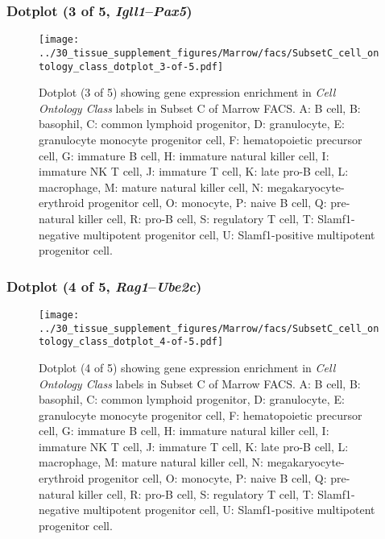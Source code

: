 \subsubsection{Dotplot (3 of 5, \emph{Igll1}--\emph{Pax5})}
\begin{figure}[h]
\centering
\texttt{[image: ../30\_tissue\_supplement\_figures/Marrow/facs/SubsetC\_cell\_ontology\_class\_dotplot\_3-of-5.pdf]}

\caption{ Dotplot (3 of 5)  showing gene expression enrichment in \emph{Cell Ontology Class} labels in Subset C of Marrow FACS. A: B cell, B: basophil, C: common lymphoid progenitor, D: granulocyte, E: granulocyte monocyte progenitor cell, F: hematopoietic precursor cell, G: immature B cell, H: immature natural killer cell, I: immature NK T cell, J: immature T cell, K: late pro-B cell, L: macrophage, M: mature natural killer cell, N: megakaryocyte-erythroid progenitor cell, O: monocyte, P: naive B cell, Q: pre-natural killer cell, R: pro-B cell, S: regulatory T cell, T: Slamf1-negative multipotent progenitor cell, U: Slamf1-positive multipotent progenitor cell.}
\end{figure}


\clearpage

\subsubsection{Dotplot (4 of 5, \emph{Rag1}--\emph{Ube2c})}
\begin{figure}[h]
\centering
\texttt{[image: ../30\_tissue\_supplement\_figures/Marrow/facs/SubsetC\_cell\_ontology\_class\_dotplot\_4-of-5.pdf]}

\caption{ Dotplot (4 of 5)  showing gene expression enrichment in \emph{Cell Ontology Class} labels in Subset C of Marrow FACS. A: B cell, B: basophil, C: common lymphoid progenitor, D: granulocyte, E: granulocyte monocyte progenitor cell, F: hematopoietic precursor cell, G: immature B cell, H: immature natural killer cell, I: immature NK T cell, J: immature T cell, K: late pro-B cell, L: macrophage, M: mature natural killer cell, N: megakaryocyte-erythroid progenitor cell, O: monocyte, P: naive B cell, Q: pre-natural killer cell, R: pro-B cell, S: regulatory T cell, T: Slamf1-negative multipotent progenitor cell, U: Slamf1-positive multipotent progenitor cell.}
\end{figure}


\clearpage

